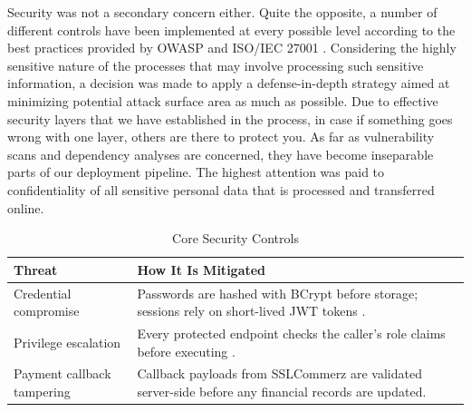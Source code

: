 \documentclass{thesis-library}
\begin{document}
Security was not a secondary concern either. Quite the opposite, a number of different controls have been implemented at every possible level according to the best practices provided by OWASP \cite{owasp2021top10} and ISO/IEC 27001 \cite{iso27001security}. Considering the highly sensitive nature of the processes that may involve processing such sensitive information, a decision was made to apply a defense-in-depth strategy aimed at minimizing potential attack surface area as much as possible. Due to effective security layers that we have established in the process, in case if something goes wrong with one layer, others are there to protect you. As far as vulnerability scans and dependency analyses are concerned, they have become inseparable parts of our deployment pipeline. The highest attention was paid to confidentiality of all sensitive personal data that is processed and transferred online.

\begin{table}[H]
    \centering
    \caption{Core Security Controls}
    \vspace{10pt}
    \begin{tabularx}{\linewidth}{|P{4.5cm}|L|}
        \hline
        \textbf{Threat} & \textbf{How It Is Mitigated} \\
        \hline
        Credential compromise & Passwords are hashed with BCrypt before storage; sessions rely on short-lived JWT tokens \cite{provos1999bcrypt,jones2015jwt}. \\
        \hline
        Privilege escalation & Every protected endpoint checks the caller's role claims before executing \cite{sandhu1996rbac}. \\
        \hline
        Payment callback tampering & Callback payloads from SSLCommerz are validated server-side before any financial records are updated. \\
        \hline
    \end{tabularx}
\end{table}
\end{document}
